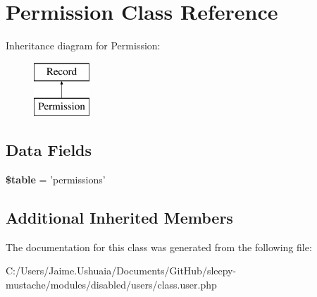 \hypertarget{class_permission}{\section{Permission Class Reference}
\label{class_permission}
}
Inheritance diagram for Permission\-:\begin{figure}[H]
\begin{center}
\leavevmode
\includegraphics[height=2.000000cm]{class_permission}
\end{center}
\end{figure}
\subsection*{Data Fields}
\begin{DoxyCompactItemize}
\item 
\hypertarget{class_permission_ae8876a14058f368335baccf35af4a22b}{{\bfseries \$table} = 'permissions'}\label{class_permission_ae8876a14058f368335baccf35af4a22b}

\end{DoxyCompactItemize}
\subsection*{Additional Inherited Members}


The documentation for this class was generated from the following file\-:\begin{DoxyCompactItemize}
\item 
C\-:/\-Users/\-Jaime.\-Ushuaia/\-Documents/\-Git\-Hub/sleepy-\/mustache/modules/disabled/users/class.\-user.\-php\end{DoxyCompactItemize}
